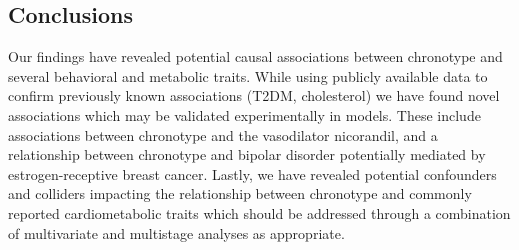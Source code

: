\documentclass[genes,article,accept,moreauthors,pdftex]{Definitions/mdpi}
\begin{document}
\begin{paracol}{2}
\section{Conclusions}
Our findings have revealed potential causal associations between chronotype and several behavioral and metabolic traits. While using publicly available data to confirm previously known associations (T2DM, cholesterol) we have found novel associations which may be validated experimentally in models. These include associations between chronotype and the vasodilator nicorandil, and a relationship between chronotype and bipolar disorder potentially mediated by estrogen-receptive breast cancer. Lastly, we have revealed potential confounders and colliders impacting the relationship between chronotype and commonly reported cardiometabolic traits which should be addressed through a combination of multivariate and multistage analyses as appropriate.




\vspace{6pt} 




\end{paracol}
\end{document}

